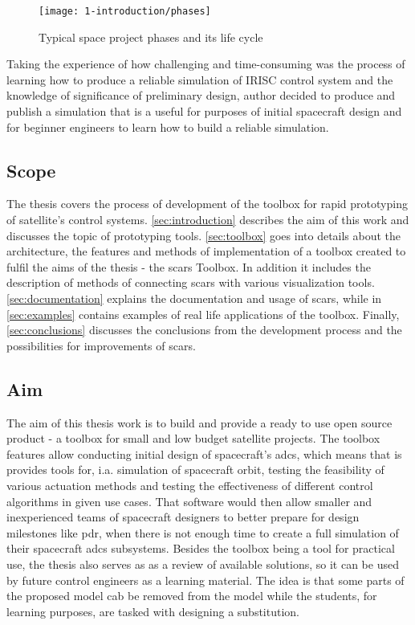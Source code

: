     \begin{figure}[H]
        \centering
        \texttt{[image: 1-introduction/phases]}
        \caption{Typical space project phases and its life cycle\cite{nguyen2000effective}}
        \label{fig:phases}
    \end{figure}

    Taking the experience of how challenging and time-consuming was the process of learning how to produce a reliable simulation of IRISC control system and the knowledge of significance of preliminary design, author decided to produce and publish a simulation that is a useful for purposes of initial spacecraft design and for beginner engineers to learn how to build a reliable simulation. 
    
\subsection{Scope}
    The thesis covers the process of development of the toolbox for rapid prototyping of satellite's control systems. \autoref{sec:introduction} describes the aim of this work and discusses the topic of prototyping tools. \autoref{sec:toolbox} goes into details about the architecture, the features and methods of implementation of a toolbox created to fulfil the aims of the thesis - the \ac{scars} Toolbox. In addition it includes the description of methods of connecting \ac{scars} with various visualization tools. \autoref{sec:documentation} explains the documentation and usage of \ac{scars}, while in \autoref{sec:examples} contains examples of real life applications of the toolbox. Finally, \autoref{sec:conclusions} discusses the conclusions from the development process and the possibilities for improvements of \ac{scars}.

\subsection{Aim}\label{sec:aim}
    The aim of this thesis work is to build and provide a ready to use open source product - a toolbox for small and low budget satellite projects.  The toolbox features allow conducting initial design of spacecraft's \ac{adcs}, which means that is provides tools for, i.a. simulation of spacecraft orbit, testing the feasibility of various actuation methods and testing the effectiveness of different control algorithms in given use cases. That software would then allow smaller and inexperienced teams of spacecraft designers to better prepare for design milestones like \ac{pdr}, when there is not enough time to create a full simulation of their spacecraft \ac{adcs} subsystems. Besides the toolbox being a tool for practical use, the thesis also serves as as a review of available solutions, so it can be used by future control engineers as a learning material. The idea is that some parts of the proposed model cab be removed from the model while the students, for learning purposes, are tasked with designing a substitution.

